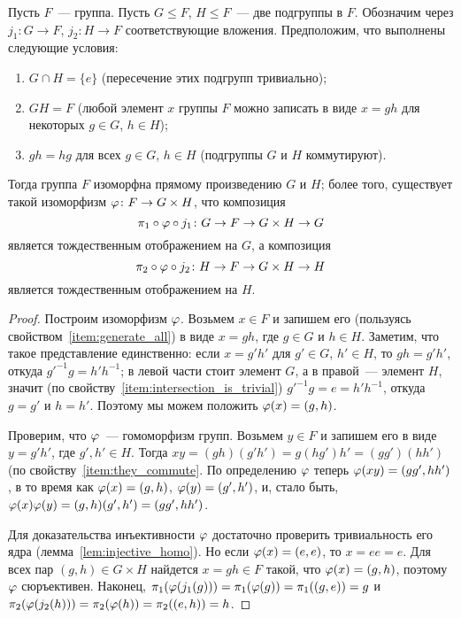 \begin{theorem}\label{thm:direct_product}
Пусть $F$~--- группа. Пусть $G\leq F$, $H\leq F$~--- две подгруппы в
$F$. Обозначим через $j_1\colon G\to F$, $j_2\colon H\to F$
соответствующие вложения.
Предположим, что выполнены следующие условия:
\begin{enumerate}
\item\label{item:intersection_is_trivial} $G\cap H = \{e\}$
  (пересечение этих подгрупп тривиально);
\item\label{item:generate_all} $GH=F$ (любой элемент $x$ группы $F$
  можно записать в виде $x = gh$ для некоторых $g\in G$, $h\in H$);
\item\label{item:they_commute} $gh=hg$ для всех $g\in G$, $h\in H$
  (подгруппы $G$ и $H$ коммутируют).
\end{enumerate}
Тогда группа $F$ изоморфна прямому произведению $G$ и $H$; более
того, существует такой изоморфизм $\varphi\colon F\to G\times H$,
что композиция
$$
\pi_1\circ\varphi\circ j_1\colon G\to F\to G\times H\to G
$$
является тождественным отображением на $G$, а композиция
$$
\pi_2\circ\varphi\circ j_2\colon H\to F\to G\times H\to H
$$
является тождественным отображением на $H$.
\end{theorem}
\begin{proof}
Построим изоморфизм $\varphi$. Возьмем $x\in F$ и запишем его (пользуясь
свойством~\ref{item:generate_all}) в виде $x = gh$, где $g\in G$ и
$h\in
H$. Заметим, что такое представление единственно: если $x = g'h'$ для
$g'\in G$, $h'\in H$, то $gh=g'h'$, откуда 
$g'^{-1}g = h'h^{-1}$; в левой части стоит элемент $G$, а в правой~---
элемент $H$, значит (по свойству~\ref{item:intersection_is_trivial})
$g'^{-1}g = e = h'h^{-1}$, откуда $g=g'$ и $h=h'$.
Поэтому мы можем положить $\varphi(x) = (g,h)$.

Проверим, что $\varphi$~--- гомоморфизм групп. Возьмем $y\in F$ и запишем
его в виде $y = g'h'$, где $g',h'\in H$.
Тогда $xy = (gh)(g'h') = g(hg')h' = (gg')(hh')$ (по
свойству~\ref{item:they_commute}. По определению $\varphi$ теперь
$\varphi(xy) = (gg',hh')$, в то время как $\varphi(x) = (g,h)$, $\varphi(y) =
(g',h')$, и, стало быть, $\varphi(x)\varphi(y) = (g,h)(g',h') = (gg', hh')$.

Для доказательства инъективности $\varphi$ достаточно проверить
тривиальность его ядра (лемма~\ref{lem:injective_homo}). Но если
$\varphi(x) = (e,e)$, то $x = ee = e$. Для всех пар $(g,h)\in
G\times H$ найдется $x=gh\in F$ такой, что $\varphi(x)=(g,h)$, поэтому
$\varphi$ сюръективен.
Наконец, $\pi_1(\varphi(j_1(g))) = \pi_1(\varphi(g)) = \pi_1((g,e)) = g$ и
$\pi_2(\varphi(j_2(h))) = \pi_2(\varphi(h)) = \pi_2((e,h)) = h$.
\end{proof}

